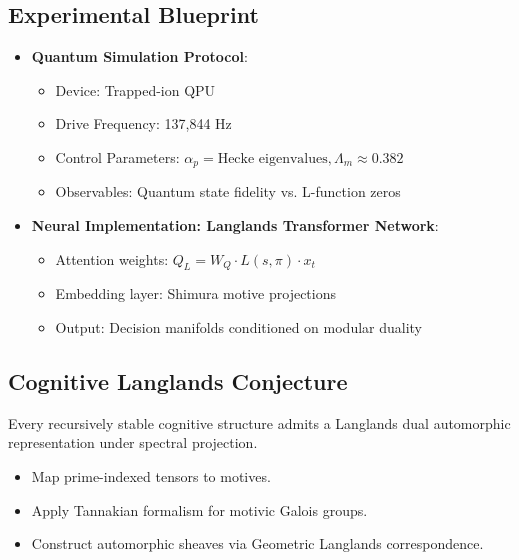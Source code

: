 \documentclass[12pt]{article}
\begin{document}
\subsection{Experimental Blueprint}
\begin{itemize}
    \item \textbf{Quantum Simulation Protocol}:
    \begin{itemize}
        \item Device: Trapped-ion QPU
        \item Drive Frequency: 137,844 Hz
        \item Control Parameters: \( \alpha_p = \text{Hecke eigenvalues}, \Lambda_m \approx 0.382 \)
        \item Observables: Quantum state fidelity vs. L-function zeros
    \end{itemize}
    \item \textbf{Neural Implementation: Langlands Transformer Network}:
    \begin{itemize}
        \item Attention weights: \( Q_L = W_Q \cdot L(s, \pi) \cdot x_t \)
        \item Embedding layer: Shimura motive projections
        \item Output: Decision manifolds conditioned on modular duality
    \end{itemize}
\end{itemize}

\subsection{Cognitive Langlands Conjecture}
\begin{conjecture}
Every recursively stable cognitive structure admits a Langlands dual automorphic representation under spectral projection.
\end{conjecture}
\begin{proofstrategy}
\begin{itemize}
    \item Map prime-indexed tensors to motives.
    \item Apply Tannakian formalism for motivic Galois groups.
    \item Construct automorphic sheaves via Geometric Langlands correspondence.
\end{itemize}
\end{proofstrategy}
\end{document}
